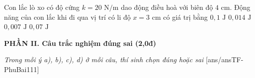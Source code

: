 \begin{ex}%
	Con lắc lò xo có độ cứng $k=20\text{ N/m}$ dao động điều hoà với biên độ $4\text{ cm}$. Động năng của con lắc khi đi qua vị trí có li độ $x=3\text{ cm}$ có giá trị bằng
	\choice
	{$0,1\text{ J}$}
	{$0,014\text{ J}$}
	{\True $0,007\text{ J}$}
	{$0,07\text{ J}$}
\end{ex}


\noindent \textbf{PHẦN II. Câu trắc nghiệm đúng sai (2,0đ)}

\noindent \textit{Trong mỗi ý a), b), c), d) ở mỗi câu, thí sinh chọn đúng hoặc sai}
[ans/ansTF-PhuBai111]

